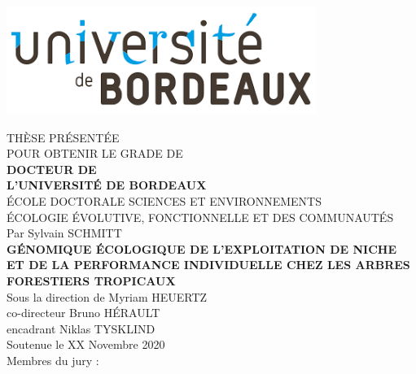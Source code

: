 \includegraphics[width=0.3\columnwidth]{images/UB.png}

\begin{center}
  \normalsize{THÈSE PRÉSENTÉE} \\
  \normalsize{POUR OBTENIR LE GRADE DE} \\
  \vspace*{\fill}
  \Large{\textbf{DOCTEUR DE}} \\
  \Large{\textbf{L'UNIVERSITÉ DE BORDEAUX}} \\
  \vspace*{\fill}
  \normalsize{ÉCOLE DOCTORALE SCIENCES ET ENVIRONNEMENTS} \\
  \normalsize{ÉCOLOGIE ÉVOLUTIVE, FONCTIONNELLE ET DES COMMUNAUTÉS} \\
  \vspace*{\fill}
  \normalsize{Par Sylvain SCHMITT} \\
  \vspace*{\fill}
  \Large{\textbf{GÉNOMIQUE ÉCOLOGIQUE DE L'EXPLOITATION DE NICHE ET DE LA PERFORMANCE INDIVIDUELLE CHEZ LES ARBRES FORESTIERS TROPICAUX}} \\
  \vspace*{\fill}
  \normalsize{Sous la direction de Myriam HEUERTZ} \\
  \normalsize{co-directeur Bruno HÉRAULT} \\
  \normalsize{encadrant Niklas TYSKLIND} \\
  \vspace*{\fill}
  \normalsize{Soutenue le XX Novembre 2020} \\
  \vspace*{\fill}
  \normalsize{Membres du jury :} \\
  \vspace*{\fill}
  \begin{table}[b]
    \centering
\end{table}
\end{center}
